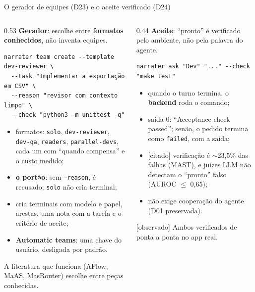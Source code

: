 \documentclass[11pt,aspectratio=169]{beamer}
\newcommand{\ev}[2]{{\scriptsize\sffamily\colorbox{#1!12}{\textcolor{#1!80!black}{[#2]}}}}
\newcommand{\observado}{\ev{cDevA}{observado}}
\newcommand{\citado}{\ev{suave}{citado}}
\begin{document}
\begin{frame}[fragile]{O gerador de equipes (D23) e o aceite verificado (D24)}
\begin{columns}[T]
\begin{column}{0.53\linewidth}
\scriptsize
\textbf{\small Gerador}: escolhe entre \textbf{formatos conhecidos}, não inventa equipes.
\begin{lstlisting}[basicstyle=\ttfamily\tiny, breaklines=false]
narrater team create --template dev-reviewer \
  --task "Implementar a exportação em CSV" \
  --reason "revisor com contexto limpo" \
  --check "python3 -m unittest -q"
\end{lstlisting}
\begin{itemize}\setlength\itemsep{0.15em}
\item formatos: \texttt{solo}, \texttt{dev-reviewer}, \texttt{dev-qa}, \texttt{readers}, \texttt{parallel-devs},
  cada um com ``quando compensa'' e o custo medido;
\item \textbf{o portão}: sem \texttt{--reason}, é recusado; \texttt{solo} não cria terminal;
\item cria terminais com modelo e papel, arestas, uma nota com a tarefa e o critério de aceite;
\item \textbf{Automatic teams}: uma chave do usuário, desligada por padrão.
\end{itemize}
{\tiny\color{suave} A literatura que funciona (AFlow, MaAS, MasRouter) escolhe entre peças conhecidas.}
\end{column}
\begin{column}{0.44\linewidth}
\scriptsize
\textbf{\small Aceite}: ``pronto'' é verificado pelo ambiente, não pela palavra do agente.
\begin{lstlisting}[basicstyle=\ttfamily\tiny, breaklines=false]
narrater ask "Dev" "..." --check "make test"
\end{lstlisting}
\begin{itemize}\setlength\itemsep{0.15em}
\item quando o turno termina, o \textbf{backend} roda o comando;
\item saída 0: ``Acceptance check passed''; senão, o pedido termina como \texttt{failed}, com a saída;
\item \citado{} verificação é $\sim$23,5\% das falhas (MAST), e juízes LLM não detectam o ``pronto'' falso
  (AUROC $\le$ 0,65);
\item não exige cooperação do agente (D01 preservada).
\end{itemize}
\observado{} Ambos verificados de ponta a ponta no app real.
\end{column}
\end{columns}
\end{frame}
\end{document}
